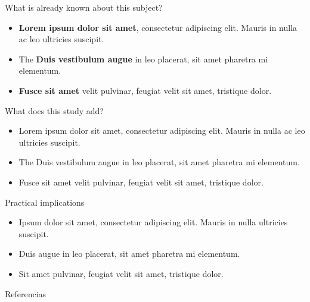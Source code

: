 \documentclass[final]{beamer}
\newlength{\colwidth}
\begin{document}
\begin{frame}[t]
\begin{columns}[t]
\begin{column}{\colwidth}
\begin{exampleblock}{What is already known about this subject?}
    \begin{itemize}
      \item \textbf{Lorem ipsum dolor sit amet}, consectetur adipiscing elit. Mauris in nulla ac leo ultricies suscipit.
      \item The \textbf{Duis vestibulum augue} in leo placerat, sit amet pharetra mi elementum.
      \item \textbf{Fusce sit amet} velit pulvinar, feugiat velit sit amet, tristique dolor.
    \end{itemize}

  \end{exampleblock}

  
  \begin{exampleblock}{What does this study add?}
    \begin{itemize}
      \item Lorem ipsum dolor sit amet, consectetur adipiscing elit. Mauris in nulla ac leo ultricies suscipit.
      \item The Duis vestibulum augue in leo placerat, sit amet pharetra mi elementum.
      \item Fusce sit amet velit pulvinar, feugiat velit sit amet, tristique dolor.
    \end{itemize}

  \end{exampleblock}


  \begin{exampleblock}{Practical implications}
    \begin{itemize}
      \item Ipsum dolor sit amet, consectetur adipiscing elit. Mauris in nulla ultricies suscipit.
      \item Duis augue in leo placerat, sit amet pharetra mi elementum.
      \item Sit amet pulvinar, feugiat velit sit amet, tristique dolor.
    \end{itemize}

  \end{exampleblock}


  \begin{block}{Referencias}


\end{block}
\end{column}
\end{columns}
\end{frame}
\end{document}

